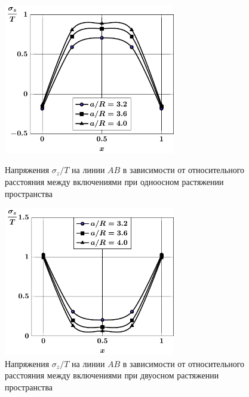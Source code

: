 \begin{russian}
\begin{figure}[h!]
\centering\footnotesize
\parbox[b]{7.5cm}{\centering\includegraphics[width=7.5cm]{inc5-a-d95-g25-t1-ab-sig_z.pdf}
\caption{Напряжения $\sigma_z/T$ на линии  $AB$ в зависимости от относительного расстояния между включениями при одноосном растяжении пространства
\label{f:8:58}}}\hfil\hfil
\parbox[b]{7.5cm}{\centering\includegraphics[width=7.5cm]{inc5-a-d95-g25-t2-ab-sig_z.pdf}
\caption{Напряжения $\sigma_z/T$ на линии  $AB$ в зависимости от относительного расстояния между включениями при двуосном растяжении пространства
\label{f:8:59}}}
\end{figure}


\end{russian}
